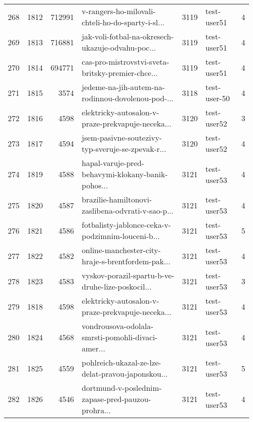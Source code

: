 \begin{tabular}{lrrlrlr}
268  &       1812 &   712991 &  v-rangers-ho-milovali-chteli-ho-do-sparty-i-sl... &     3119 &                  test-user51 &               4 \\
269  &       1813 &   716881 &  jak-voli-fotbal-na-okresech-ukazuje-odvahu-poc... &     3119 &                  test-user51 &               4 \\
270  &       1814 &   694771 &  cas-pro-mistrovstvi-sveta-britsky-premier-chce... &     3119 &                  test-user51 &               4 \\
271  &       1815 &     3574 &  jedeme-na-jih-autem-na-rodinnou-dovolenou-pod-... &     3118 &                 test-user-50 &               4 \\
272  &       1816 &     4598 &  elektricky-autosalon-v-praze-prekvapuje-neceka... &     3120 &                  test-user52 &               3 \\
273  &       1817 &     4594 &  jsem-pasivne-soutezivy-typ-sveruje-se-zpevak-r... &     3120 &                  test-user52 &               4 \\
274  &       1819 &     4588 &  hapal-varuje-pred-behavymi-klokany-banik-pohos... &     3121 &                  test-user53 &               4 \\
275  &       1820 &     4587 &  brazilie-hamiltonovi-zaslibena-odvrati-v-sao-p... &     3121 &                  test-user53 &               4 \\
276  &       1821 &     4586 &  fotbalisty-jablonce-ceka-v-podzimnim-louceni-b... &     3121 &                  test-user53 &               5 \\
277  &       1822 &     4582 &  online-manchester-city-hraje-s-brentfordem-pak... &     3121 &                  test-user53 &               4 \\
278  &       1823 &     4583 &  vyskov-porazil-spartu-b-ve-druhe-lize-poskocil... &     3121 &                  test-user53 &               3 \\
279  &       1818 &     4598 &  elektricky-autosalon-v-praze-prekvapuje-neceka... &     3121 &                  test-user53 &               4 \\
280  &       1824 &     4568 &  vondrousova-odolala-smrsti-pomohli-divaci-amer... &     3121 &                  test-user53 &               4 \\
281  &       1825 &     4559 &  pohlreich-ukazal-ze-lze-delat-pravou-japonskou... &     3121 &                  test-user53 &               5 \\
282  &       1826 &     4546 &  dortmund-v-poslednim-zapase-pred-pauzou-prohra... &     3121 &                  test-user53 &               4 \\

\end{tabular}
